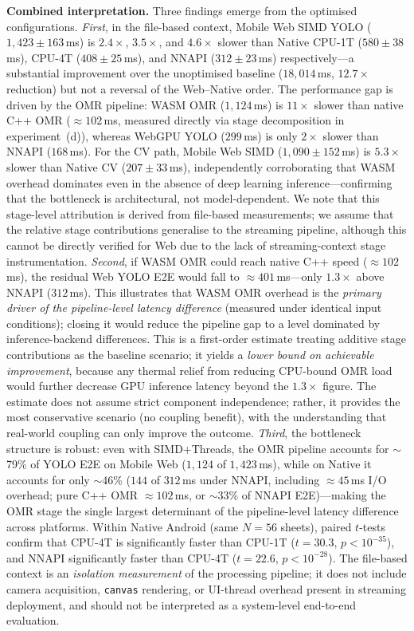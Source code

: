 \documentclass[conference]{IEEEtran}
\begin{document}
\textbf{Combined interpretation.}
Three findings emerge from the optimised configurations.
\emph{First}, in the file-based context, Mobile Web SIMD YOLO
($1{,}423\pm163$\,ms) is $2.4\times$, $3.5\times$, and $4.6\times$
slower than Native CPU-1T ($580\pm38$\,ms), CPU-4T ($408\pm25$\,ms),
and NNAPI ($312\pm23$\,ms) respectively---a substantial improvement
over the unoptimised baseline ($18{,}014$\,ms, $12.7\times$ reduction)
but not a reversal of the Web--Native order.
The performance gap is driven by the OMR pipeline:
WASM OMR ($1{,}124$\,ms) is $11\times$ slower than native C++ OMR
($\approx102$\,ms, measured directly via stage decomposition in
experiment~(d)), whereas WebGPU YOLO ($299$\,ms) is only $2\times$
slower than NNAPI ($168$\,ms).
For the CV path, Mobile Web SIMD ($1{,}090\pm152$\,ms) is $5.3\times$
slower than Native CV ($207\pm33$\,ms), independently corroborating
that WASM overhead dominates even in the absence of deep learning
inference---confirming that the bottleneck is architectural, not
model-dependent.
We note that this stage-level attribution is derived from file-based
measurements; we assume that the relative stage contributions
generalise to the streaming pipeline, although this cannot be
directly verified for Web due to the lack of streaming-context
stage instrumentation.
\emph{Second}, if WASM OMR could reach native C++ speed ($\approx102$\,ms),
the residual Web YOLO E2E would fall to $\approx401$\,ms---only
$1.3\times$ above NNAPI ($312$\,ms). This illustrates that WASM OMR
overhead is the \emph{primary driver of the pipeline-level latency
difference} (measured under identical input conditions); closing it
would reduce the pipeline gap to a level dominated by inference-backend
differences.
This is a first-order estimate treating additive stage contributions
as the baseline scenario; it yields a \emph{lower bound on achievable
improvement}, because any thermal relief from reducing CPU-bound OMR
load would further decrease GPU inference latency beyond the
$1.3\times$ figure.
The estimate does not assume strict component independence; rather,
it provides the most conservative scenario (no coupling benefit),
with the understanding that real-world coupling can only improve
the outcome.
\emph{Third}, the bottleneck structure is robust: even with SIMD+Threads,
the OMR pipeline accounts for $\sim$79\% of YOLO E2E on Mobile Web
($1{,}124$ of $1{,}423$\,ms), while on Native it accounts for only
$\sim$46\% ($144$ of $312$\,ms under NNAPI, including $\approx45$\,ms
I/O overhead; pure C++ OMR $\approx102$\,ms, or $\sim$33\% of
NNAPI E2E)---making the OMR stage the single largest determinant of
the pipeline-level latency difference across platforms.
Within Native Android (same $N=56$ sheets), paired $t$-tests confirm
that CPU-4T is significantly faster than CPU-1T ($t=30.3$,
$p<10^{-35}$), and NNAPI significantly faster than CPU-4T
($t=22.6$, $p<10^{-28}$).
The file-based context is an \emph{isolation measurement} of the
processing pipeline; it does not include camera acquisition,
\texttt{canvas} rendering, or UI-thread overhead present in streaming
deployment, and should not be interpreted as a system-level
end-to-end evaluation.
\end{document}
